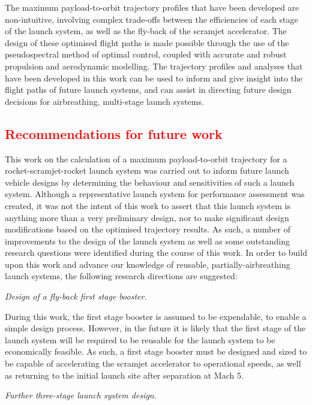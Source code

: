 The maximum payload-to-orbit trajectory profiles that have been developed are non-intuitive, involving complex trade-offs between the efficiencies of each stage of the launch system, as well as the fly-back of the scramjet accelerator. The design of these optimised flight paths is made possible through the use of the pseudospectral method of optimal control, coupled with accurate and robust propulsion and aerodynamic modelling.  
The trajectory profiles and analyses that have been developed in this work can be used to inform and give insight into the flight paths of future launch systems, and can assist in directing future design decisions for airbreathing, multi-stage launch systems. 

\textcolor{red}{
  \chapter{Recommendations for future work}
}
\noindent  	
 This work on the calculation of a maximum payload-to-orbit trajectory for a rocket-scramjet-rocket launch system was carried out to inform future launch vehicle designs by determining the behaviour and sensitivities of such a launch system. 
  Although a representative launch system for performance assessment was created, it was not the intent of this work to assert that this launch system is anything more than a very preliminary design, nor to make significant design modifications based on the optimised trajectory results.
 As such, a number of improvements to the design of the launch system as well as some outstanding research questions were identified during the course of this work.
 In order to build upon this work and advance our knowledge of reusable, partially-airbreathing launch systems, the following research directions are suggested:


\vspace{10pt}
 \textit{Design of a fly-back first stage booster.}
 
 \noindent
 During this work, the first stage booster is assumed to be expendable, to enable a simple design process. However, in the future it is likely that the first stage of the launch system will be required to be reusable for the launch system to be economically feasible. As such, a first stage booster must be designed and sized to be capable of accelerating the scramjet accelerator to operational speeds, as well as returning to the initial launch site after separation at Mach 5. 

\vspace{10pt}
	\textit{Further three-stage launch system design.}

